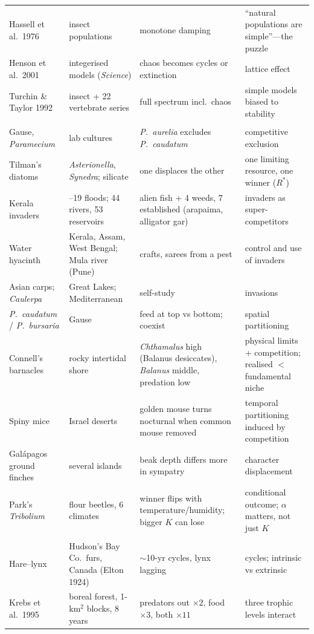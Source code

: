 {\begin{longtable}{>{\raggedright\arraybackslash}p{}>{\raggedright\arraybackslash}p{}>{\raggedright\arraybackslash}p{}>{\raggedright\arraybackslash}p{}}
Hassell et al.\ 1976 & 24 insect populations & 22 monotone damping & ``natural populations are simple''---the puzzle\\
Henson et al.\ 2001 & integerised models (\emph{Science}) & chaos becomes cycles or extinction & lattice effect\\
Turchin \& Taylor 1992 & 14 insect + 22 vertebrate series & full spectrum incl.\ chaos & simple models biased to stability\\
\midrule
\multicolumn{4}{l}{\textbf{EE04 Competition and invasions}}\\
Gause, \emph{Paramecium} & lab cultures & \emph{P.\ aurelia} excludes \emph{P.\ caudatum} & competitive exclusion\\
Tilman's diatoms & \emph{Asterionella}, \emph{Synedra}; silicate & one displaces the other & one limiting resource, one winner ($R^*$)\\
Kerala invaders & 2018--19 floods; 44 rivers, 53 reservoirs & 28 alien fish + 4 weeds, 7 established (arapaima, alligator gar) & invaders as super-competitors\\
Water hyacinth & Kerala, Assam, West Bengal; Mula river (Pune) & crafts, sarees from a pest & control and use of invaders\\
Asian carps; \emph{Caulerpa} & Great Lakes; Mediterranean & self-study & invasions\\
\emph{P.\ caudatum} / \emph{P.\ bursaria} & Gause & feed at top vs bottom; coexist & spatial partitioning\\
Connell's barnacles & rocky intertidal shore & \emph{Chthamalus} high (Balanus desiccates), \emph{Balanus} middle, predation low & physical limits + competition; realised $<$ fundamental niche\\
Spiny mice & Israel deserts & golden mouse turns nocturnal when common mouse removed & temporal partitioning induced by competition\\
Galápagos ground finches & several islands & beak depth differs more in sympatry & character displacement\\
Park's \emph{Tribolium} & flour beetles, 6 climates & winner flips with temperature/humidity; bigger $K$ can lose & conditional outcome; $\alpha$ matters, not just $K$\\
\midrule
\multicolumn{4}{l}{\textbf{EE05 Predation}}\\
Hare--lynx & Hudson's Bay Co.\ furs, Canada (Elton 1924) & $\sim$10-yr cycles, lynx lagging & cycles; intrinsic vs extrinsic\\
Krebs et al.\ 1995 & boreal forest, 1-km$^2$ blocks, 8 years & predators out $\times2$, food $\times3$, both $\times11$ & three trophic levels interact\\

\end{longtable}}
